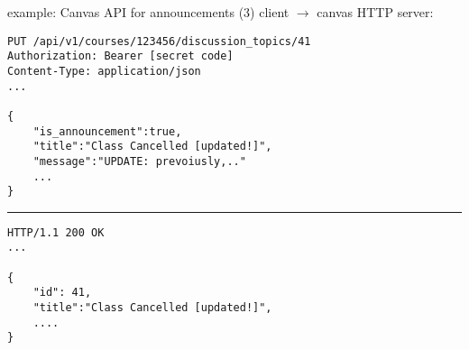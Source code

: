 \begin{frame}[fragile]{example: Canvas API for announcements (3)}
client $\rightarrow$ canvas HTTP server:
\begin{Verbatim}[fontsize=\fontsize{9}{10}\selectfont]
PUT /api/v1/courses/123456/discussion_topics/41
Authorization: Bearer [secret code]
Content-Type: application/json
...

{
    "is_announcement":true,
    "title":"Class Cancelled [updated!]",
    "message":"UPDATE: prevoiusly,.."
    ...
}
\end{Verbatim}
\rule{0.9\textwidth}{1mm}
\begin{Verbatim}[fontsize=\fontsize{9}{10}\selectfont]
HTTP/1.1 200 OK
...

{
    "id": 41,
    "title":"Class Cancelled [updated!]",
    ....
}
\end{Verbatim}
\end{frame}

